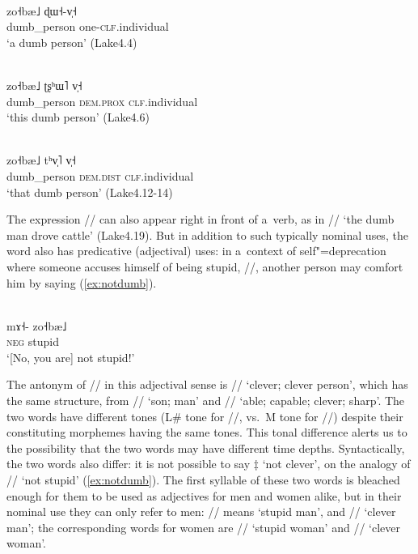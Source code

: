  

\begin{exe}
	\ex
	\label{ex:onedumb}
	\\
	\gll zo˧bæ˩		ɖɯ˧-v̩˧\\
	dumb\_person	one-\textsc{clf}.individual\\
	\glt ‘a dumb person’ (Lake4.4)
\end{exe}

\begin{exe}
	\ex
	\label{ex:thisdumb}
	\\
	\gll zo˧bæ˩		ʈʂʰɯ˥	v̩˧\\
	dumb\_person	\textsc{dem.prox}	\textsc{clf}.individual\\
	\glt ‘this dumb person’ (Lake4.6)
\end{exe}

\begin{exe}
	\ex
	\label{ex:thatdumb}
	\\
	\gll zo˧bæ˩		tʰv̩˥	v̩˧\\
	dumb\_person	\textsc{dem.dist}	\textsc{clf}.individual\\
	\glt ‘that dumb person’ (Lake4.12-14)
\end{exe}

The expression // can also appear right in front of a~verb, as in // ‘the dumb man drove cattle’ (Lake4.19). But in addition to such typically nominal uses, the word also has predicative (adjectival) uses: in a~context of self"=deprecation where someone accuses himself of being stupid, //, another person may comfort him by saying (\ref{ex:notdumb}).

\begin{exe}
	\ex
	\label{ex:notdumb}
	\\
	\gll mɤ˧-		zo˧bæ˩\\
	\textsc{neg}	stupid\\
	\glt ‘[No, you are] not stupid!’
\end{exe}

The antonym of // in this adjectival sense is // ‘clever; clever person’, which has the same structure, from // ‘son; man’ and // ‘able; capable; clever; sharp’. The two words have different tones (L\# tone for //, vs.\ M tone for //) despite their constituting morphemes having the same tones. This tonal difference alerts us to the possibility that the two words may have different time depths. Syntactically, the two words also differ: it is not possible to say $\ddagger${\kern2pt} ‘not clever’, on the {analogy} of // ‘not stupid’ (\ref{ex:notdumb}). The first syllable of these two words is bleached enough for them to be used as adjectives for men and women alike, but in their nominal use they can only refer to men: // means ‘stupid man’, and // ‘clever man’; the corresponding words for women are // ‘stupid woman’ and // ‘clever woman’.


